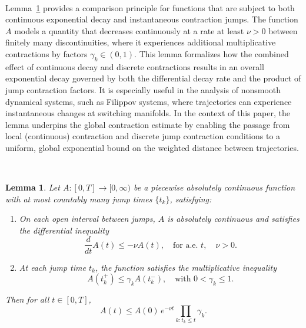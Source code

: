 \documentclass[11pt]{article}
\newtheorem{lemma}{Lemma}
\begin{document}
\

Lemma~\ref{lem:comparison_jumps} provides a comparison principle for functions that are subject to both continuous exponential decay and instantaneous contraction jumps. The function \(A\) models a quantity that decreases continuously at a rate at least \(\nu > 0\) between finitely many discontinuities, where it experiences additional multiplicative contractions by factors \(\gamma_k \in (0,1)\). This lemma formalizes how the combined effect of continuous decay and discrete contractions results in an overall exponential decay governed by both the differential decay rate and the product of jump contraction factors. It is especially useful in the analysis of nonsmooth dynamical systems, such as Filippov systems, where trajectories can experience instantaneous changes at switching manifolds. In the context of this paper, the lemma underpins the global contraction estimate by enabling the passage from local (continuous) contraction and discrete jump contraction conditions to a uniform, global exponential bound on the weighted distance between trajectories.

\


\begin{lemma}\label{lem:comparison_jumps}
	Let \(A: [0,T] \to [0,\infty)\) be a piecewise absolutely continuous function with at most countably many jump times \(\{t_k\}\), satisfying:
	\begin{enumerate}
		\item On each open interval between jumps, \(A\) is absolutely continuous and satisfies the differential inequality
		\[
		\frac{d}{dt} A(t) \le -\nu A(t), \quad \text{for a.e. } t, \quad \nu > 0.
		\]
		\item At each jump time \(t_k\), the function satisfies the multiplicative inequality
		\[
		A(t_k^+) \le \gamma_k A(t_k^-), \quad \text{with } 0 < \gamma_k \le 1.
		\]
	\end{enumerate}
	Then for all \(t \in [0,T]\),
	\[
	A(t) \le A(0)\, e^{-\nu t} \prod_{k: t_k \le t} \gamma_k.
	\]
\end{lemma}

\
\end{document}
